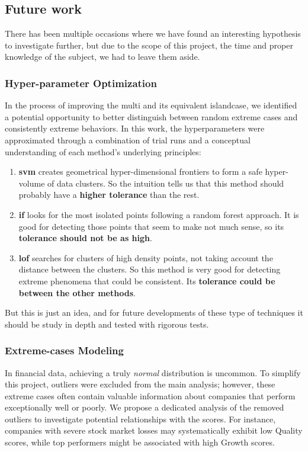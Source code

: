 \documentclass[11pt,english,a4paper,hidelinks]{book}
\begin{document}
\subsection{Future work}

\noindent There has been multiple occasions where we have found an interesting hypothesis to investigate further, but due to the scope of this project, the time and proper knowledge of the subject, we had to leave them aside.

\subsubsection{Hyper-parameter Optimization}

\noindent In the process of improving the \acrshort{multi} and its equivalent \acrshort{islandcase}, we identified a potential opportunity to better distinguish between random extreme cases and consistently extreme behaviors. In this work, the hyperparameters were approximated through a combination of trial runs and a conceptual understanding of each method’s underlying principles:
\begin{enumerate}
    \item \textbf{\acrshort{svm}} creates geometrical hyper-dimensional frontiers to form a safe hyper-volume of data clusters. So the intuition tells us that this method should probably have a \textbf{higher tolerance} than the rest.
    \item \textbf{\acrshort{if}} looks for the most isolated points following a random forest approach. It is good for detecting those points that seem to make not much sense, so its \textbf{tolerance should not be as high}.
    \item \textbf{\acrshort{lof}} searches for clusters of high density points, not taking account the distance between the clusters. So this method is very good for detecting extreme phenomena that could be consistent. Its \textbf{tolerance could be between the other methods}.
\end{enumerate}

\noindent But this is just an idea, and for future developments of these type of techniques it should be study in depth and tested with rigorous tests.

\subsubsection{Extreme-cases Modeling}

\noindent In financial data, achieving a truly \textit{normal} distribution is uncommon. To simplify this project, outliers were excluded from the main analysis; however, these extreme cases often contain valuable information about companies that perform exceptionally well or poorly. We propose a dedicated analysis of the removed outliers to investigate potential relationships with the scores. For instance, companies with severe stock market losses may systematically exhibit low Quality scores, while top performers might be associated with high Growth scores.
\end{document}
